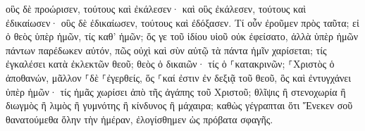 \documentclass{openreader}
\begin{document}
οὓς δὲ προώρισεν, τούτους καὶ ἐκάλεσεν· καὶ οὓς ἐκάλεσεν, τούτους καὶ ἐδικαίωσεν· οὓς δὲ ἐδικαίωσεν, τούτους καὶ ἐδόξασεν. 
Τί οὖν ἐροῦμεν πρὸς ταῦτα; εἰ ὁ θεὸς ὑπὲρ ἡμῶν, τίς καθ’ ἡμῶν; 
ὅς γε τοῦ ἰδίου υἱοῦ οὐκ ἐφείσατο, ἀλλὰ ὑπὲρ ἡμῶν πάντων παρέδωκεν αὐτόν, πῶς οὐχὶ καὶ σὺν αὐτῷ τὰ πάντα ἡμῖν χαρίσεται; 
τίς ἐγκαλέσει κατὰ ἐκλεκτῶν θεοῦ; θεὸς ὁ δικαιῶν· 
τίς ὁ ⸀κατακρινῶν; ⸀Χριστὸς ὁ ἀποθανών, μᾶλλον ⸀δὲ ⸀ἐγερθείς, ὅς ⸀καί ἐστιν ἐν δεξιᾷ τοῦ θεοῦ, ὃς καὶ ἐντυγχάνει ὑπὲρ ἡμῶν· 
τίς ἡμᾶς χωρίσει ἀπὸ τῆς ἀγάπης τοῦ Χριστοῦ; θλῖψις ἢ στενοχωρία ἢ διωγμὸς ἢ λιμὸς ἢ γυμνότης ἢ κίνδυνος ἢ μάχαιρα; 
καθὼς γέγραπται ὅτι Ἕνεκεν σοῦ θανατούμεθα ὅλην τὴν ἡμέραν, ἐλογίσθημεν ὡς πρόβατα σφαγῆς. 
\end{document}
